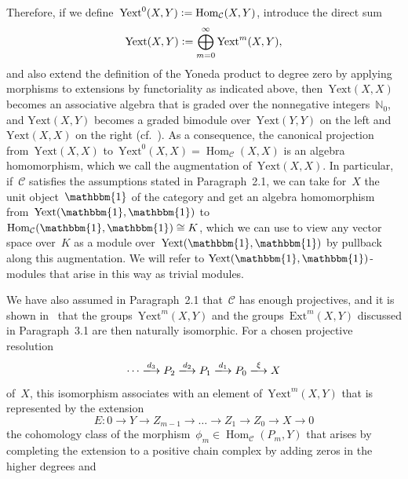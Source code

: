 \documentclass[12pt]{article}
\theoremstyle{definition}
\theoremstyle{break}
\newcommand{\N}{\mathbb{N}}
\newcommand{\CC}{\mathcal{C}}
\DeclareMathOperator\Hom{Hom}
\newcommand{\Ext}{\mathrm{Ext}}
\newcommand{\Yext}{\mathrm{Yext}}
\renewcommand{\1}{\mathbbm{1}}
\newcommand{\deq}{\vcentcolon =}
\begin{document}
\vspace{1mm}

Therefore, if we define~$\Yext^0(X,Y) \deq \Hom_\CC(X,Y)$, introduce the direct sum
\[\Yext(X,Y) \deq \bigoplus_{m=0}^\infty \Yext^m(X,Y),\]
and also extend the definition of the Yoneda product to degree zero by applying morphisms to extensions by functoriality as indicated above, then~$\Yext(X,X)$
becomes an associative algebra that is graded over the nonnegative integers~$\N_0$, and $\Yext(X,Y)$ becomes a graded bimodule over~$\Yext(Y,Y)$ on the left and~$\Yext(X,X)$ on the right (cf.~\cite[Chap.~VII, \S~3, p.~175]{Mi}). As a consequence, the canonical projection from~$\Yext(X,X)$ to~$\Yext^0(X,X) = \Hom_\CC(X,X)$ is an algebra homomorphism, which we call the augmentation of~$\Yext(X,X)$. In particular, if~$\CC$ satisfies the assumptions stated in Paragraph~2.1, we can take for~$X$ the unit object~$\1$ of the category and get an algebra homomorphism from~$\Yext(\1,\1)$ to~$\Hom_\CC(\1,\1) \cong K$, which we can use to view any vector space over~$K$ as a module over~$\Yext(\1,\1)$ by pullback along this augmentation. We will refer to $\Yext(\1,\1)$-modules that arise in this way as trivial modules.

\vspace{1mm}

We have also assumed in Paragraph~2.1 that~$\CC$ has enough projectives, and it is shown in~\cite[Chap.~VII, \S~7, p.~182ff]{Mi} that the groups~$\Yext^m(X,Y)$ and the groups~$\Ext^m(X,Y)$ discussed in Paragraph~3.1 are then naturally isomorphic. For a chosen projective resolution
\[\cdots \xlongrightarrow{d_3} P_2 \xlongrightarrow{d_2} P_1 \xlongrightarrow{d_1} P_0
\xlongrightarrow{\xi} X\]
of~$X$, this isomorphism associates with an element of~$\Yext^m(X,Y)$ that is represented by the extension
\vspace{0.5mm}
\[E \colon 0 \to Y \to Z_{m-1} \to \dots \to Z_1 \to Z_0 \to X \to 0\]
the cohomology class of the morphism~$\phi_m \in \Hom_{\CC}(P_m,Y)$ that arises by completing the extension to a positive chain complex by adding zeros in the higher degrees and\hfill
\pagebreak
\end{document}
